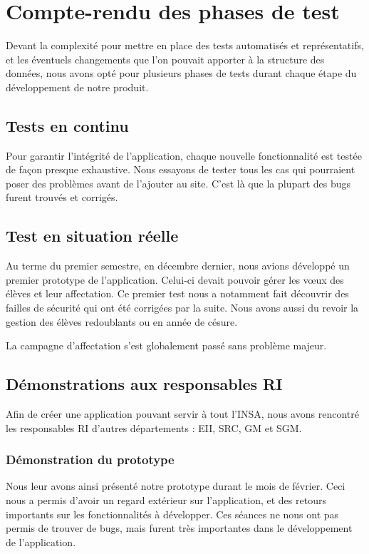 \chapter{Compte-rendu des phases de test}

Devant la complexité pour mettre en place des tests automatisés et représentatifs, et les éventuels changements que l'on pouvait apporter à la structure des données, nous avons opté pour plusieurs phases de tests durant chaque étape du développement de notre produit.

\section{Tests en continu}

Pour garantir l'intégrité de l'application, chaque nouvelle fonctionnalité est testée de façon presque exhaustive. Nous essayons de tester tous les cas qui pourraient poser des problèmes avant de l'ajouter au site. C'est là que la plupart des bugs furent trouvés et corrigés.

\section{Test en situation réelle}
Au terme du premier semestre, en décembre dernier, nous avions développé un premier prototype de l'application. Celui-ci devait pouvoir gérer les vœux des élèves et leur affectation. 
Ce premier test nous a notamment fait découvrir des failles de sécurité qui ont été corrigées par la suite. Nous avons aussi du revoir la gestion des élèves redoublants ou en année de césure.

La campagne d'affectation s'est globalement passé sans problème majeur.

\section{Démonstrations aux responsables RI}
Afin de créer une application pouvant servir à tout l'INSA, nous avons rencontré les responsables RI d'autres départements : EII, SRC, GM et SGM. 
\subsection{Démonstration du prototype}
Nous leur avons ainsi présenté notre prototype durant le mois de février. Ceci nous a permis d'avoir un regard extérieur sur l'application, et des retours importants sur les fonctionnalités à développer. Ces séances ne nous ont pas permis de trouver de bugs, mais furent très importantes dans le développement de l'application.
